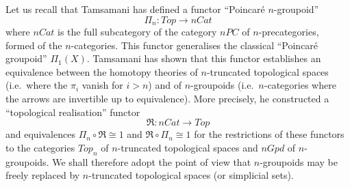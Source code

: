 Let us recall that Tamsamani \cite{Tamsamani} has defined a functor
``Poincaré
$n$-groupoid''
$$
\Pi _n : Top \rightarrow nCat
$$
where $nCat$ is the full subcategory of the category $nPC$ of
$n$-precategories, formed of the $n$-categories. This functor generalises
the classical ``Poincaré groupoid'' $\Pi _1(X)$. Tamsamani has shown that
this functor establishes an equivalence between the homotopy theories
of $n$-truncated topological spaces (i.e.\ where the $\pi _i$ vanish for
$i>n$) and of $n$-groupoids (i.e.\ $n$-categories where the arrows are
invertible up to equivalence). More precisely, he constructed a
``topological realisation'' functor
$$
\Re : nCat \rightarrow Top
$$
and equivalences $\Pi _n \circ \Re\cong 1$ and $\Re \circ \Pi _n \cong 1$
for the restrictions of these functors to the categories $Top _n$ of
$n$-truncated topological spaces and $nGpd$ of $n$-groupoids. We shall
therefore adopt the
point of view that $n$-groupoids may be freely replaced by
$n$-truncated topological spaces (or simplicial sets).

